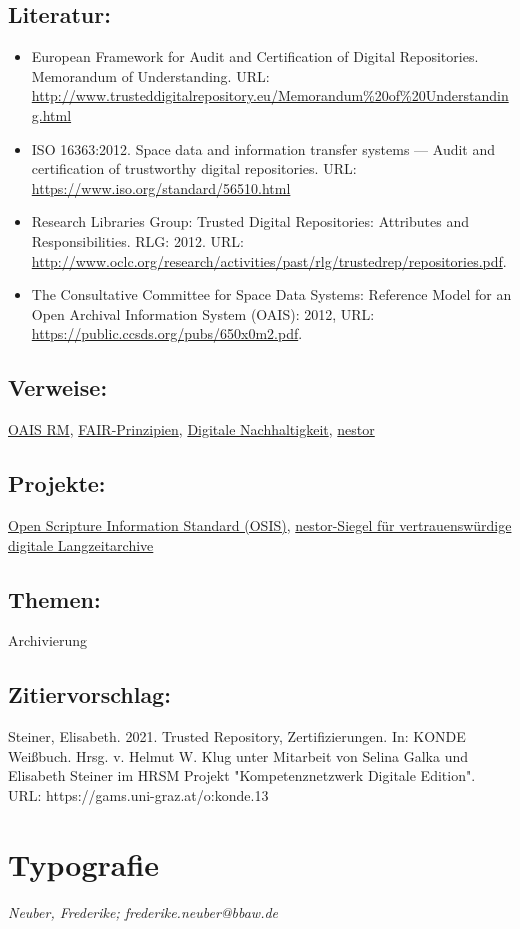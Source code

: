 \documentclass{article}
\begin{document}
        \subsection*{Literatur:}\begin{itemize}\item European Framework for Audit and Certification of Digital Repositories.
                              Memorandum of Understanding. URL: \url{http://www.trusteddigitalrepository.eu/Memorandum%20of%20Understanding.html}\item ISO 16363:2012. Space data and information transfer systems — Audit and certification of trustworthy digital repositories. URL: \url{https://www.iso.org/standard/56510.html}\item Research Libraries Group: Trusted Digital Repositories: Attributes and Responsibilities. RLG: 2012. URL: \url{http://www.oclc.org/research/activities/past/rlg/trustedrep/repositories.pdf}.\item The Consultative Committee for Space Data Systems: Reference Model for an Open Archival Information System (OAIS): 2012, URL: \url{https://public.ccsds.org/pubs/650x0m2.pdf}.\end{itemize}\subsection*{Verweise:}\href{https://gams.uni-graz.at/o:konde.11}{OAIS RM}, \href{https://gams.uni-graz.at/o:konde.7}{FAIR-Prinzipien}, \href{https://gams.uni-graz.at/o:konde.6}{Digitale Nachhaltigkeit}, \href{https://gams.uni-graz.at/o:konde.4}{nestor}\subsection*{Projekte:}\href{https://crosswire.org/osis/}{Open Scripture Information Standard (OSIS)}, \href{https://www.langzeitarchivierung.de/Webs/nestor/DE/Zertifizierung/nestor_Siegel/siegel.html}{nestor-Siegel für vertrauenswürdige digitale Langzeitarchive}\subsection*{Themen:}Archivierung\subsection*{Zitiervorschlag:}Steiner, Elisabeth. 2021. Trusted Repository, Zertifizierungen. In: KONDE Weißbuch. Hrsg. v. Helmut W. Klug unter Mitarbeit von Selina Galka und Elisabeth Steiner im HRSM Projekt "Kompetenznetzwerk Digitale Edition". URL: https://gams.uni-graz.at/o:konde.13\newpage\section*{Typografie} \emph{Neuber, Frederike; frederike.neuber@bbaw.de   }\\
        
\end{document}
